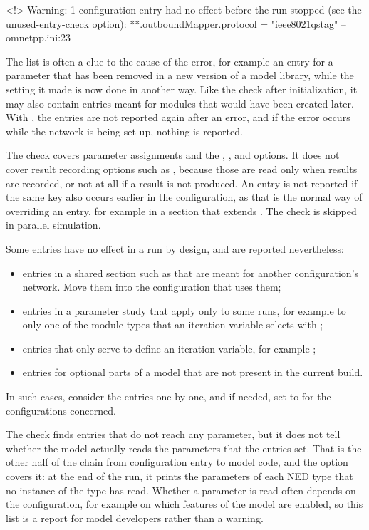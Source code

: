 \begin{filelisting}
<!> Warning: 1 configuration entry had no effect before the run stopped (see
the unused-entry-check option):
  **.outboundMapper.protocol = "ieee8021qstag"  -- omnetpp.ini:23
\end{filelisting}

The list is often a clue to the cause of the error, for example an entry
for a parameter that has been removed in a new version of a model library,
while the setting it made is now done in another way. Like the check after
initialization, it may also contain entries meant for modules that would
have been created later. With , the entries are not
reported again after an error, and if the error occurs while the network
is being set up, nothing is reported.

The check covers parameter assignments and the ,
,  and  options. It does
not cover result recording options such as , because
those are read only when results are recorded, or not at all if a result is
not produced. An entry is not reported if the same key also occurs earlier
in the configuration, as that is the normal way of overriding an entry,
for example in a section that extends \ttt{[General]}. The check is skipped
in parallel simulation.

Some entries have no effect in a run by design, and are reported
nevertheless:

\begin{itemize}
  \item entries in a shared section such as \ttt{[General]} that are meant
    for another configuration's network. Move them into the configuration
    that uses them;
  \item entries in a parameter study that apply only to some runs, for
    example to only one of the module types that an iteration variable
    selects with ;
  \item entries that only serve to define an iteration variable, for example
    ;
  \item entries for optional parts of a model that are not present in the
    current build.
\end{itemize}

In such cases, consider the entries one by one, and if needed, set
 to  for the configurations
concerned.

The check finds entries that do not reach any parameter, but it does not
tell whether the model actually reads the parameters that the entries set.
That is the other half of the chain from configuration entry to model
code, and the  option covers it: at the
end of the run, it prints the parameters of each NED type that no instance
of the type has read. Whether a parameter is read often depends on the
configuration, for example on which features of the model are enabled, so
this list is a report for model developers rather than a warning.


